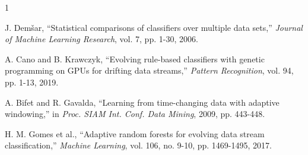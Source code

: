 \documentclass[conference]{IEEEtran}
\begin{document}
\begin{thebibliography}{1}

J. Demšar, ``Statistical comparisons of classifiers over multiple data sets,'' \textit{Journal of Machine Learning Research}, vol. 7, pp. 1-30, 2006.

A. Cano and B. Krawczyk, ``Evolving rule-based classifiers with genetic programming on GPUs for drifting data streams,'' \textit{Pattern Recognition}, vol. 94, pp. 1-13, 2019.

A. Bifet and R. Gavalda, ``Learning from time-changing data with adaptive windowing,'' in \textit{Proc. SIAM Int. Conf. Data Mining}, 2009, pp. 443-448.

H. M. Gomes et al., ``Adaptive random forests for evolving data stream classification,'' \textit{Machine Learning}, vol. 106, no. 9-10, pp. 1469-1495, 2017.

\end{thebibliography}
\end{document}
